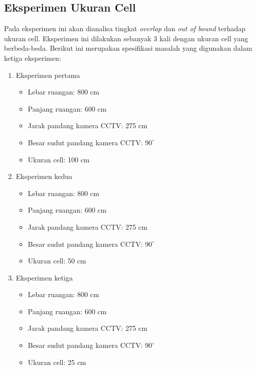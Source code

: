 \subsection{Eksperimen Ukuran Cell}
Pada eksperimen ini akan dianalisa tingkat \textit{overlap} dan \textit{out of bound} terhadap ukuran cell. Eksperimen ini dilakukan sebanyak 3 kali dengan ukuran cell yang berbeda-beda. Berikut ini merupakan spesifikasi masalah yang digunakan dalam ketiga eksperimen:
\begin{enumerate}
	\item Eksperimen pertama
	\begin{itemize}
		\item Lebar ruangan: 800 cm
		\item Panjang ruangan: 600 cm
		\item Jarak pandang kamera CCTV: 275 cm
		\item Besar sudut pandang kamera CCTV: \(90^\circ\)
		\item Ukuran cell: 100 cm
	\end{itemize}
		
	\item Eksperimen kedua
	\begin{itemize}
		\item Lebar ruangan: 800 cm
		\item Panjang ruangan: 600 cm
		\item Jarak pandang kamera CCTV: 275 cm
		\item Besar sudut pandang kamera CCTV: \(90^\circ\)
		\item Ukuran cell: 50 cm
	\end{itemize}
		
	\item Eksperimen ketiga
	\begin{itemize}
		\item Lebar ruangan: 800 cm
		\item Panjang ruangan: 600 cm
		\item Jarak pandang kamera CCTV: 275 cm
		\item Besar sudut pandang kamera CCTV: \(90^\circ\)
		\item Ukuran cell: 25 cm
	\end{itemize}
\end{enumerate}
	
